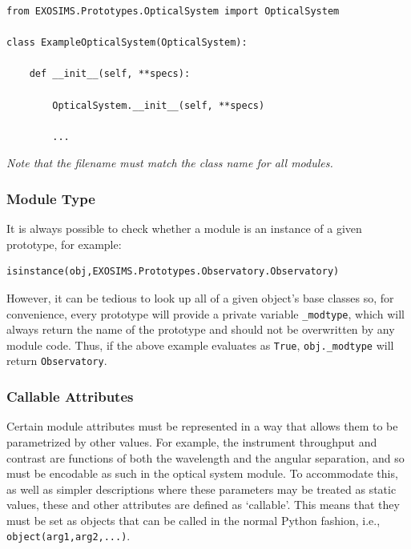 \documentclass[cleanfoot]{asme2ej}
\begin{document}
\begin{verbatim}
from EXOSIMS.Prototypes.OpticalSystem import OpticalSystem

class ExampleOpticalSystem(OpticalSystem):
    
    def __init__(self, **specs):
                
        OpticalSystem.__init__(self, **specs)
        
        ...

\end{verbatim}

\emph{Note that the filename must match the class name for all modules.}

\subsubsection{Module Type}
It is always possible to check whether a module is an instance of a given prototype, for example:
\begin{verbatim}
isinstance(obj,EXOSIMS.Prototypes.Observatory.Observatory)
\end{verbatim}
However, it can be tedious to look up all of a given object's base classes so, for convenience, every prototype will provide a private variable \verb+_modtype+, which will always return the name of the prototype and should not be overwritten by any module code.  Thus, if the above example evaluates as \verb+True+, \verb+obj._modtype+ will return \verb+Observatory+.

\subsubsection{Callable Attributes}
Certain module attributes must be represented in a way that allows them to be parametrized by other values.  For example, the instrument throughput and contrast are functions of both the wavelength and the angular separation, and so must be encodable as such in the optical system module.  To accommodate this, as well as simpler descriptions where these parameters may be treated as static values, these and other attributes are defined as `callable'.  This means that they must be set as objects that can be called in the normal Python fashion, i.e., \verb+object(arg1,arg2,...)+.  
\end{document}
